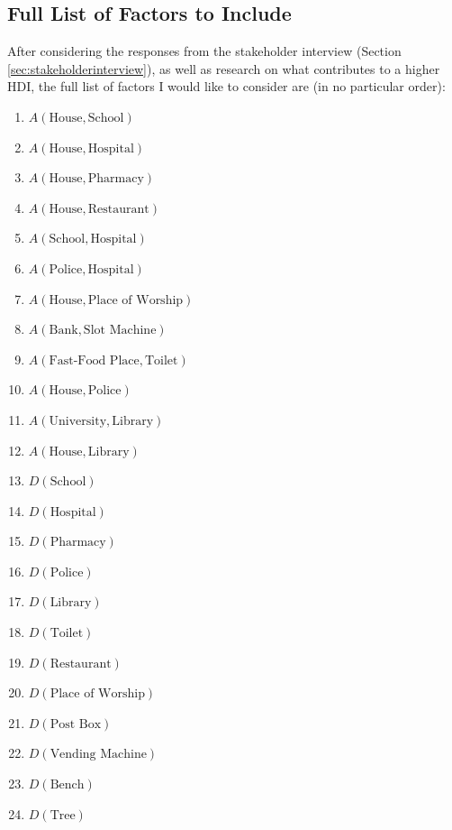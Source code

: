 \documentclass[12pt]{report}
\begin{document}
\subsection{Full List of Factors to Include}\label{sec:listOfFactors}
After considering the responses from the stakeholder interview (Section \ref{sec:stakeholderinterview}), as well as research on what contributes to a higher HDI, the full list of factors I would like to consider are (in no particular order):
\begin{multicols}{2}
\begin{enumerate}
    \item $A\left(\text{House},\text{School}\right)$
    \item $A\left(\text{House},\text{Hospital}\right)$
    \item $A\left(\text{House},\text{Pharmacy}\right)$
    \item $A\left(\text{House},\text{Restaurant}\right)$
    \item $A\left(\text{School},\text{Hospital}\right)$
    \item $A\left(\text{Police},\text{Hospital}\right)$
    \item $A\left(\text{House},\text{Place of Worship}\right)$
    \item $A\left(\text{Bank},\text{Slot Machine}\right)$
    \item $A\left(\text{Fast-Food Place},\text{Toilet}\right)$
    \item $A\left(\text{House},\text{Police}\right)$
    \item $A\left(\text{University},\text{Library}\right)$
    \item $A\left(\text{House},\text{Library}\right)$
    \item $D\left(\text{School}\right)$
    \item $D\left(\text{Hospital}\right)$
    \item $D\left(\text{Pharmacy}\right)$
    \item $D\left(\text{Police}\right)$
    \item $D\left(\text{Library}\right)$
    \item $D\left(\text{Toilet}\right)$
    \item $D\left(\text{Restaurant}\right)$
    \item $D\left(\text{Place of Worship}\right)$
    \item $D\left(\text{Post Box}\right)$
    \item $D\left(\text{Vending Machine}\right)$
    \item $D\left(\text{Bench}\right)$
    \item $D\left(\text{Tree}\right)$
\end{enumerate}
\end{multicols}
\end{document}
